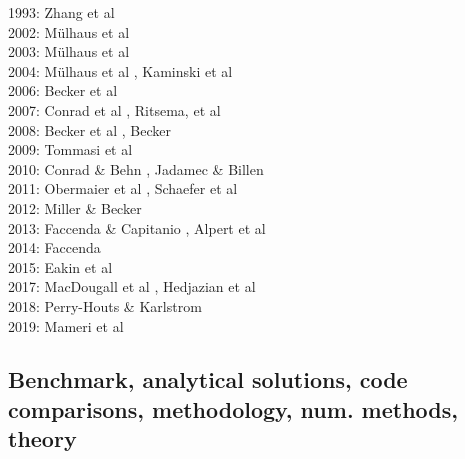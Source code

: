 \begin{scriptsize}
1993: Zhang et al \cite{zhhj93}\\
2002: M\"ulhaus et al \cite{mudm02}\\
2003: M\"ulhaus et al \cite{mumc03}\\
2004: M\"ulhaus et al \cite{mumc04}, Kaminski et al \cite{karb04}\\
2006: Becker et al \cite{besb06}\\
2007: Conrad et al \cite{cobs07}, Ritsema, et al \cite{rimb07}\\
2008: Becker et al \cite{beke08}, Becker \cite{beck08}\\
2009: Tommasi et al \cite{tokv09}\\
2010: Conrad \& Behn \cite{cobe10}, Jadamec \& Billen \cite{jabi10a}\\
2011: Obermaier et al \cite{obbh11}, Schaefer et al \cite{scbb11}\\
2012: Miller \& Becker \cite{mibe12}\\
2013: Faccenda \& Capitanio \cite{faca13}, Alpert et al \cite{almb13}\\
2014: Faccenda \cite{facc14}\\
2015: Eakin et al \cite{ealw15}\\
2017: MacDougall et al \cite{majf17}, Hedjazian et al \cite{hegd17}\\
2018: Perry-Houts \& Karlstrom \cite{peka18}\\
2019: Mameri et al \cite{mats19}
\end{scriptsize}

\subsection{Benchmark, analytical solutions, code comparisons, methodology, num. methods, theory}

